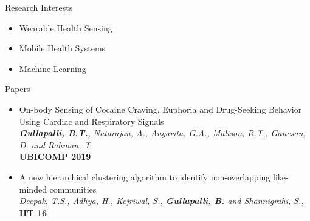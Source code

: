 \documentclass{resume} %
\begin{document}
\vspace*{-1.5mm}
\begin{rSection}{Research Interests}
\begin{itemize}[leftmargin=*]
\itemsep -0.5em 
\item Wearable Health Sensing
\item Mobile Health Systems
\item Machine Learning

\end{itemize}

\end{rSection}
\vspace*{-1.5mm}
\begin{rSection}{Papers}

\begin{itemize}[leftmargin=*]
\item On-body Sensing of Cocaine Craving, Euphoria and Drug-Seeking Behavior Using Cardiac and Respiratory Signals \\ \textit{\textbf{Gullapalli, B.T.},  Natarajan, A., Angarita, G.A., Malison, R.T., Ganesan, D. and Rahman, T} \\ \textbf{UBICOMP 2019} 
\item A new hierarchical clustering algorithm to identify non-overlapping like-minded communities \\ \textit{Deepak, T.S., Adhya, H., Kejriwal, S., \textbf{Gullapalli, B.} and Shannigrahi, S.,} \\ \textbf{HT 16} 
\end{itemize}
\end{rSection}
\end{document}
